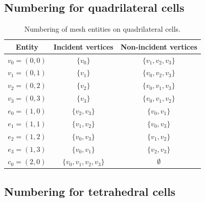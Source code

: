 \subsection{Numbering for quadrilateral cells}

\begin{table}[H]
\linespread{1.1}\selectfont
  \begin{center}
    \begin{tabular}{|c|c|c|}
      \hline
      Entity & Incident vertices & Non-incident vertices \\
      \hline
      \hline
      $v_0 = (0, 0)$ & $\{v_0\}$ & $\{v_1, v_2, v_3\}$ \\
      \hline
      $v_1 = (0, 1)$ & $\{v_1\}$ & $\{v_0, v_2, v_3\}$ \\
      \hline
      $v_2 = (0, 2)$ & $\{v_2\}$ & $\{v_0, v_1, v_3\}$ \\
      \hline
      $v_3 = (0, 3)$ & $\{v_3\}$ & $\{v_0, v_1, v_2\}$ \\
      \hline
      $e_0 = (1, 0)$ & $\{v_2, v_3\}$ & $\{v_0, v_1\}$ \\
      \hline
      $e_1 = (1, 1)$ & $\{v_1, v_2\}$ & $\{v_0, v_3\}$ \\
      \hline
      $e_2 = (1, 2)$ & $\{v_0, v_3\}$ & $\{v_1, v_2\}$ \\
      \hline
      $e_3 = (1, 3)$ & $\{v_0, v_1\}$ & $\{v_2, v_3\}$ \\
      \hline
      $c_0 = (2, 0)$ & $\{v_0, v_1, v_2, v_3\}$ & $\emptyset$ \\
      \hline
    \end{tabular}
    \caption{Numbering of mesh entities on quadrilateral cells.}
    \label{tab:quadrilateral,entities}
  \end{center}
\end{table}

\subsection{Numbering for tetrahedral cells}

